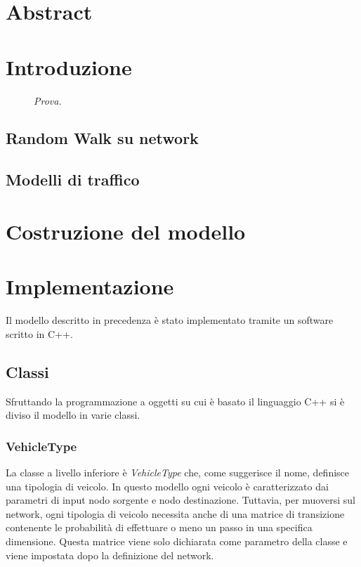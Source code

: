 \documentclass[12pt,a4paper]{report}
\begin{document}
\chapter*{\centering \Large Abstract}

\tableofcontents
\listoffigures

\chapter*{Introduzione}

\begin{figure}[H]
\centering
{}
\caption{\emph{Prova.}}
\end{figure}

\section*{Random Walk su network}

\section*{Modelli di traffico}

\chapter{Costruzione del modello}

\chapter{Implementazione}
Il modello descritto in precedenza è stato implementato tramite un software scritto in C++.
\section{Classi}
Sfruttando la programmazione a oggetti su cui è basato il linguaggio C++ si è diviso il modello in varie classi.
\subsection{VehicleType}
La classe a livello inferiore è \emph{VehicleType} che, come suggerisce il nome, definisce una tipologia di veicolo.
In questo modello ogni veicolo è caratterizzato dai parametri di input nodo sorgente e nodo destinazione.
Tuttavia, per muoversi sul network, ogni tipologia di veicolo necessita anche di una matrice di transizione contenente le probabilità di effettuare o meno un passo in una specifica dimensione.
Questa matrice viene solo dichiarata come parametro della classe e viene impostata dopo la definizione del network.
\end{document}
